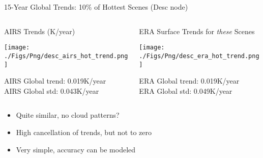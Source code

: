 \documentclass[10pt,t]{beamer}
\begin{document}
\begin{frame}[label={sec:org6d74527}]{15-Year Global Trends: 10\% of Hottest Scenes (Desc node)}
\vspace{-0.15in}
\begin{columns}
\begin{column}{0.55\columnwidth}
\begin{block}{\scriptsize AIRS Trends (K/year)}
\vspace{-0.1in}
\begin{center}
\texttt{[image: ./Figs/Png/desc\_airs\_hot\_trend.png]}
\end{center}

\vspace{-0.1in}
\small AIRS Global trend: 0.019K/year \\
\small AIRS Global std: 0.043K/year 
\end{block}
\end{column}

\begin{column}{0.55\columnwidth}
\begin{block}{\scriptsize ERA Surface Trends for \emph{these} Scenes}
\vspace{-0.1in}
\begin{center}
\texttt{[image: ./Figs/Png/desc\_era\_hot\_trend.png]}
\end{center}


\vspace{-0.1in}
\small ERA Global trend: 0.019K/year \\
\small ERA Global std: 0.049K/year
\end{block}
\end{column}
\end{columns}

\begin{itemize}
\item \small Quite similar, no cloud patterns?
\item \small High cancellation of trends, but not to zero
\item \small Very simple, accuracy can be modeled
\end{itemize}
\end{frame}
\end{document}
